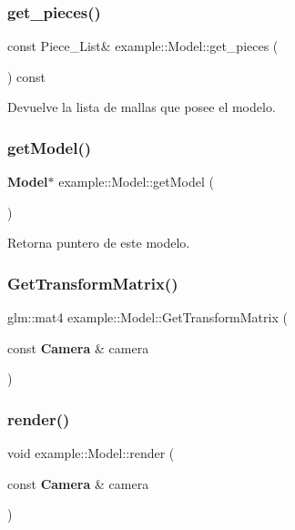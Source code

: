 \mbox{\label{classexample_1_1_model_abb215d07b750ba96146ade46428211da}} 
\subsubsection{get\_pieces()}
{\footnotesize\ttfamily const Piece\+\_\+\+List\& example\+::\+Model\+::get\+\_\+pieces (\begin{DoxyParamCaption}{ }\end{DoxyParamCaption}) const\hspace{0.3cm}{\ttfamily [inline]}}

Devuelve la lista de mallas que posee el modelo. \mbox{\label{classexample_1_1_model_a3f83759049d788d222e76e610ac7d780}} 
\subsubsection{getModel()}
{\footnotesize\ttfamily \textbf{ Model}$\ast$ example\+::\+Model\+::get\+Model (\begin{DoxyParamCaption}{ }\end{DoxyParamCaption})\hspace{0.3cm}{\ttfamily [inline]}}

Retorna puntero de este modelo. \mbox{\label{classexample_1_1_model_a60edf5c19511f7629193048c4b97000d}} 
\subsubsection{GetTransformMatrix()}
{\footnotesize\ttfamily glm\+::mat4 example\+::\+Model\+::\+Get\+Transform\+Matrix (\begin{DoxyParamCaption}\item[{const \textbf{ Camera} \&}]{camera }\end{DoxyParamCaption})\hspace{0.3cm}{\ttfamily [inline]}}

\mbox{\label{classexample_1_1_model_ae83347d4ec78eef6db285d9a3d59f3b4}} 
\subsubsection{render()}
{\footnotesize\ttfamily void example\+::\+Model\+::render (\begin{DoxyParamCaption}\item[{const \textbf{ Camera} \&}]{camera }\end{DoxyParamCaption})\hspace{0.3cm}{\ttfamily [inline]}}

